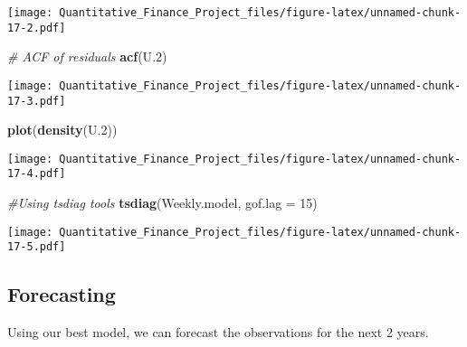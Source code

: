 \documentclass[
]{article}
\newenvironment{Shaded}{\begin{snugshade}}{\end{snugshade}}
\newcommand{\AttributeTok}[1]{\textcolor[rgb]{0.13,0.29,0.53}{#1}}
\newcommand{\CommentTok}[1]{\textcolor[rgb]{0.56,0.35,0.01}{\textit{#1}}}
\newcommand{\DecValTok}[1]{\textcolor[rgb]{0.00,0.00,0.81}{#1}}
\newcommand{\FloatTok}[1]{\textcolor[rgb]{0.00,0.00,0.81}{#1}}
\newcommand{\FunctionTok}[1]{\textcolor[rgb]{0.13,0.29,0.53}{\textbf{#1}}}
\newcommand{\NormalTok}[1]{#1}
\newcommand{\OtherTok}[1]{\textcolor[rgb]{0.56,0.35,0.01}{#1}}
\newcommand{\SpecialCharTok}[1]{\textcolor[rgb]{0.81,0.36,0.00}{\textbf{#1}}}
\newcommand{\StringTok}[1]{\textcolor[rgb]{0.31,0.60,0.02}{#1}}
\begin{document}
\texttt{[image: Quantitative\_Finance\_Project\_files/figure-latex/unnamed-chunk-17-2.pdf]}

\begin{Shaded}
\begin{Highlighting}[]
\CommentTok{\# ACF of residuals}
\FunctionTok{acf}\NormalTok{(U}\FloatTok{.2}\NormalTok{)}
\end{Highlighting}
\end{Shaded}

\texttt{[image: Quantitative\_Finance\_Project\_files/figure-latex/unnamed-chunk-17-3.pdf]}

\begin{Shaded}
\begin{Highlighting}[]
\FunctionTok{plot}\NormalTok{(}\FunctionTok{density}\NormalTok{(U}\FloatTok{.2}\NormalTok{))}
\end{Highlighting}
\end{Shaded}

\texttt{[image: Quantitative\_Finance\_Project\_files/figure-latex/unnamed-chunk-17-4.pdf]}

\begin{Shaded}
\begin{Highlighting}[]
\CommentTok{\#Using tsdiag tools}
\FunctionTok{tsdiag}\NormalTok{(Weekly.model, }\AttributeTok{gof.lag =} \DecValTok{15}\NormalTok{)}
\end{Highlighting}
\end{Shaded}

\texttt{[image: Quantitative\_Finance\_Project\_files/figure-latex/unnamed-chunk-17-5.pdf]}

\hypertarget{forecasting-1}{%
\subsection{Forecasting}\label{forecasting-1}}

Using our best model, we can forecast the observations for the next 2
years.

\begin{Shaded}
\end{Shaded}
\end{document}
